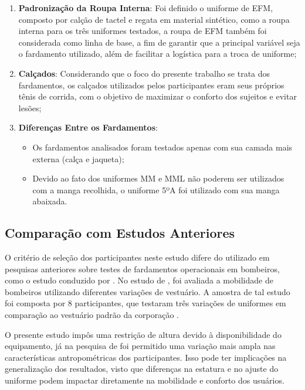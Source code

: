 \begin{enumerate}[label=\Roman*]
    \item \textbf{Padronização da Roupa Interna}: Foi definido o uniforme de \acrfull{EFM}, composto por calção de tactel e regata em material sintético, como a roupa interna para os três uniformes testados, a roupa de \acrshort{EFM} também foi considerada como linha de base, a fim de garantir que a principal variável seja o fardamento utilizado, além de facilitar a logística para a troca de uniforme;
    \item \textbf{Calçados}: Considerando que o foco do presente trabalho se trata dos fardamentos, 
    os calçados utilizados pelos participantes eram seus próprios tênis de corrida, com o objetivo de maximizar o conforto dos sujeitos e evitar lesões;
    \item \textbf{Diferenças Entre os Fardamentos}: 
    \begin{itemize}
        \item Os fardamentos analisados foram testados apenas com sua camada mais externa (calça e jaqueta);
        \item Devido ao fato dos uniformes \acrshort{MM} e \acrshort{MML} não poderem ser utilizados com a manga recolhida, o uniforme 5ºA foi utilizado com sua manga abaixada.
    \end{itemize}
     
\end{enumerate}

\subsection{Comparação com Estudos Anteriores}

O critério de seleção dos participantes neste estudo difere do utilizado em pesquisas anteriores 
sobre testes de fardamentos operacionais em bombeiros, como o estudo conduzido por 
\textcite{orr2019impact}. No estudo de \textcite{orr2019impact}, foi avaliada a mobilidade de 
bombeiros utilizando diferentes variações de vestuário. A amostra de tal estudo foi composta por 
8 participantes, que testaram três variações de uniformes em comparação ao vestuário padrão da 
corporação \cite{orr2019impact}.

O presente estudo impôs uma restrição de altura devido à disponibilidade do equipamento, 
já na pesquisa de \textcite{orr2019impact} foi permitido uma variação mais ampla nas características 
antropométricas dos participantes. Isso pode ter implicações na generalização dos resultados, visto 
que diferenças na estatura e no ajuste do uniforme podem impactar diretamente na mobilidade e 
conforto dos usuários.

